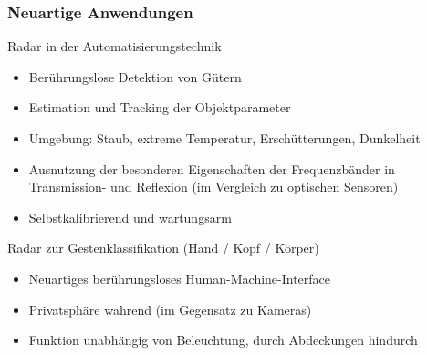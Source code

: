 \documentclass[16pt]{beamer}
\begin{document}
\begin{frame}
	\frametitle{Neuartige Anwendungen} 
	\begin{block}{Radar in der Automatisierungstechnik}
		\begin{itemize}
			\item Berührungslose Detektion von Gütern
			\item Estimation und Tracking der Objektparameter
			\item Umgebung: Staub, extreme Temperatur, Erschütterungen, Dunkelheit 
			\item Ausnutzung der besonderen Eigenschaften der Frequenzbänder in Transmission- und Reflexion (im Vergleich zu optischen Sensoren) 
			\item Selbstkalibrierend und wartungsarm
		\end{itemize} 
	\end{block}
	
	
	\begin{block}{Radar zur Gestenklassifikation (Hand / Kopf / Körper)}
 		\begin{itemize}
 			\item Neuartiges berührungsloses Human-Machine-Interface
 			\item Privatsphäre wahrend (im Gegensatz zu Kameras)
 			\item Funktion unabhängig von Beleuchtung, durch Abdeckungen hindurch
 		\end{itemize} 
	\end{block}
\end{frame}



%	
\end{document}
